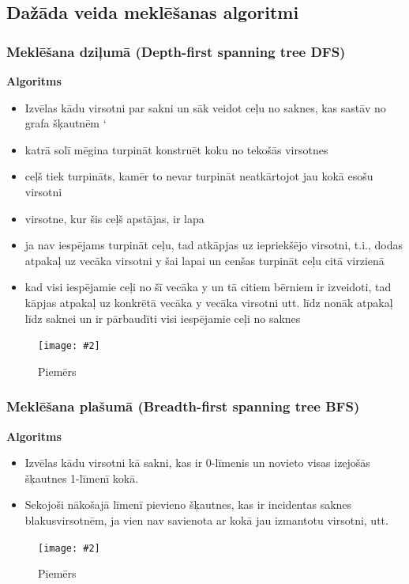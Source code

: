 \documentclass{article}
\newcommand{\illustration}[3]{
	\begin{figure}[H]
		\centering	
		\texttt{[image: \#2]}
		\caption{#3}
	\end{figure}
}
\begin{document}
\subsection{Dažāda veida meklēšanas algoritmi}

\subsubsection{Meklēšana dziļumā (Depth-first spanning tree DFS)}

\textbf{Algoritms}
\begin{itemize}
	\item Izvēlas kādu virsotni par sakni un sāk veidot ceļu no saknes, kas sastāv no grafa šķautnēm ‘
	\item katrā solī mēgina turpināt konstruēt koku no tekošās virsotnes
	\item ceļš tiek turpināts, kamēr to nevar turpināt neatkārtojot jau kokā esošu virsotni
	\item virsotne, kur šis ceļš apstājas, ir lapa
	\item ja nav iespējams turpināt ceļu, tad atkāpjas uz iepriekšējo virsotni, t.i., dodas atpakaļ uz vecāka virsotni y šai lapai un cenšas turpināt ceļu citā virzienā
	\item kad visi iespējamie ceļi no šī vecāka y un tā citiem bērniem ir izveidoti, tad kāpjas atpakaļ uz konkrētā vecāka y vecāka virsotni utt. līdz nonāk atpakaļ līdz saknei un ir pārbaudīti visi iespējamie ceļi no saknes
\end{itemize}

\illustration{1}{dfs-1}{Piemērs}

\subsubsection{Meklēšana plašumā (Breadth-first spanning tree BFS)}

\textbf{Algoritms}
\begin{itemize}
	\item Izvēlas kādu virsotni kā sakni, kas ir 0-līmenis un novieto visas izejošās šķautnes 1-līmenī kokā.
	\item Sekojoši nākošajā līmenī pievieno šķautnes, kas ir incidentas saknes blakusvirsotnēm, ja vien nav savienota ar kokā jau izmantotu virsotni, utt.
\end{itemize}

\illustration{1}{bfs-1}{Piemērs}
\end{document}
